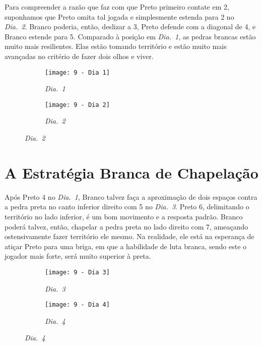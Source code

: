 Para compreender a razão que faz com que Preto primeiro contate em 2, suponhamos que Preto omita tal jogada e simplesmente estenda para 2 no \emph{Dia.\@~2}. Branco poderia, então, deslizar a 3, Preto defende com a diagonal de 4, e Branco estende para 5. Comparado à posição em \emph{Dia.\@~1}, as pedras brancas estão muito mais resilientes. Elas estão tomando território e estão muito mais avançadas no critério de fazer dois olhos e viver.

\begin{figure}[h!]
    \centering
    \begin{subfigure}[t]{.45\textwidth}
        \texttt{[image: 9 - Dia 1]}
        \caption*{\emph{Dia.\@~1}}
    \end{subfigure}
    \hspace{1cm}
    \begin{subfigure}[t]{.45\textwidth}
        \texttt{[image: 9 - Dia 2]}
        \caption*{\emph{Dia.\@~2}}
    \end{subfigure}
\end{figure}

\pagebreak

\section{A Estratégia Branca de Chapelação}

Após Preto 4 no \emph{Dia.\@~1}, Branco talvez faça a aproximação de dois espaços contra a pedra preta no canto inferior direito com 5 no \emph{Dia.\@~3}. Preto 6, delimitando o território no lado inferior, é um bom movimento e a resposta padrão. Branco poderá talvez, então, chapelar a pedra preta no lado direito com 7, ameaçando ostensivamente fazer território ele mesmo. Na realidade, ele está na esperança de atiçar Preto para uma briga, em que a habilidade de luta branca, sendo este o jogador mais forte, será muito superior à preta.

\begin{figure}[h!]
    \centering
    \begin{subfigure}[t]{.45\textwidth}
        \texttt{[image: 9 - Dia 3]}
        \caption*{\emph{Dia.\@~3}}
    \end{subfigure}
    \hspace{1cm}
    \begin{subfigure}[t]{.45\textwidth}
        \texttt{[image: 9 - Dia 4]}
        \caption*{\emph{Dia.\@~4}}
    \end{subfigure}
\end{figure}

